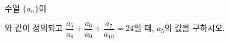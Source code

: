수열 $\{a_n\}$이\par\smallskip{}\par\smallskip\noindent 와 같이 정의되고 $\dfrac{a_5}{a_8}+\dfrac{a_6}{a_9}+\dfrac{a_7}{a_{10}}=24$일 때, $a_5$의 값을 구하시오.
